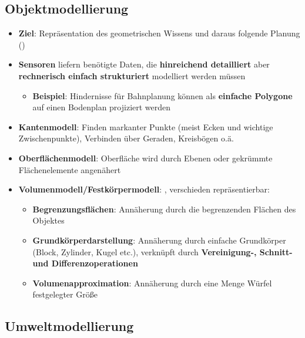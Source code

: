 \subsection{Objektmodellierung}%
\label{grep:sub:objektmodellierung}

\begin{itemize}
	\item \textbf{Ziel}: Repräsentation des geometrischen Wissens und daraus folgende Planung ()
	\item \textbf{Sensoren} liefern benötigte Daten, die \textbf{hinreichend detailliert} aber \textbf{rechnerisch einfach strukturiert} modelliert werden müssen
	\begin{itemize}
		\item \textbf{Beispiel}: Hindernisse für Bahnplanung können als \textbf{einfache Polygone} auf einen Bodenplan projiziert werden
	\end{itemize}
	\item \textbf{Kantenmodell}: Finden markanter Punkte (meist Ecken und wichtige Zwischenpunkte), Verbinden über Geraden, Kreisbögen o.ä.
	\item \textbf{Oberflächenmodell}: Oberfläche wird durch Ebenen oder gekrümmte Flächenelemente angenähert
	\item \textbf{Volumenmodell/Festkörpermodell}: , verschieden repräsentierbar:
	\begin{itemize}
		\item \textbf{Begrenzungsflächen}: Annäherung durch die begrenzenden Flächen des Objektes
		\item \textbf{Grundkörperdarstellung}: Annäherung durch einfache Grundkörper (Block, Zylinder, Kugel etc.), verknüpft durch \textbf{Vereinigung-, Schnitt- und Differenzoperationen}
		\item \textbf{Volumenapproximation}: Annäherung durch eine Menge Würfel festgelegter Größe
	\end{itemize}
\end{itemize}

\subsection{Umweltmodellierung}%
\label{grep:sub:umweltmodellierung}

